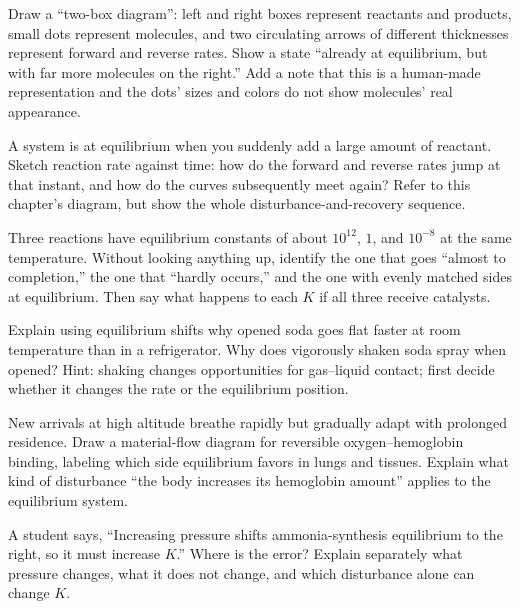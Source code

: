 \begin{sikaoti}
\item Draw a ``two-box diagram'': left and right boxes represent reactants and products, small dots represent molecules, and two circulating arrows of different thicknesses represent forward and reverse rates. Show a state ``already at equilibrium, but with far more molecules on the right.'' Add a note that this is a human-made representation and the dots' sizes and colors do not show molecules' real appearance.
\item A system is at equilibrium when you suddenly add a large amount of reactant. Sketch reaction rate against time: how do the forward and reverse rates jump at that instant, and how do the curves subsequently meet again? Refer to this chapter's diagram, but show the whole disturbance-and-recovery sequence.
\item Three reactions have equilibrium constants of about $10^{12}$, $1$, and $10^{-8}$ at the same temperature. Without looking anything up, identify the one that goes ``almost to completion,'' the one that ``hardly occurs,'' and the one with evenly matched sides at equilibrium. Then say what happens to each $K$ if all three receive catalysts.
\item Explain using equilibrium shifts why opened soda goes flat faster at room temperature than in a refrigerator. Why does vigorously shaken soda spray when opened? Hint: shaking changes opportunities for gas--liquid contact; first decide whether it changes the rate or the equilibrium position.
\item New arrivals at high altitude breathe rapidly but gradually adapt with prolonged residence. Draw a material-flow diagram for reversible oxygen--hemoglobin binding, labeling which side equilibrium favors in lungs and tissues. Explain what kind of disturbance ``the body increases its hemoglobin amount'' applies to the equilibrium system.
\item A student says, ``Increasing pressure shifts ammonia-synthesis equilibrium to the right, so it must increase $K$.'' Where is the error? Explain separately what pressure changes, what it does not change, and which disturbance alone can change $K$.
\end{sikaoti}
